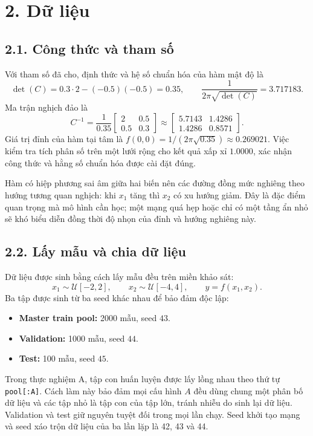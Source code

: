 \documentclass[12pt,a4paper]{article}
\begin{document}
\section{2. Dữ liệu}

\subsection{2.1. Công thức và tham số}

Với tham số đã cho, định thức và hệ số chuẩn hóa của hàm mật độ là
$$\det(C) = 0.3\cdot 2 - (-0.5)(-0.5) = 0.35, \qquad \frac{1}{2\pi\sqrt{\det(C)}} = 3.717183.$$
Ma trận nghịch đảo là
$$C^{-1} = \frac{1}{0.35}\begin{bmatrix}2 & 0.5\\ 0.5 & 0.3\end{bmatrix} \approx \begin{bmatrix}5.7143 & 1.4286\\ 1.4286 & 0.8571\end{bmatrix}.$$
Giá trị đỉnh của hàm tại tâm là $f(0,0) = 1/(2\pi\sqrt{0.35}) \approx 0.269021$. Việc kiểm tra tích phân số trên một lưới rộng cho kết quả xấp xỉ $1.0000$, xác nhận công thức và hằng số chuẩn hóa được cài đặt đúng.

Hàm có hiệp phương sai âm giữa hai biến nên các đường đồng mức nghiêng theo hướng tương quan nghịch: khi $x_1$ tăng thì $x_2$ có xu hướng giảm. Đây là đặc điểm quan trọng mà mô hình cần học; một mạng quá hẹp hoặc chỉ có một tầng ẩn nhỏ sẽ khó biểu diễn đồng thời độ nhọn của đỉnh và hướng nghiêng này.

\subsection{2.2. Lấy mẫu và chia dữ liệu}

Dữ liệu được sinh bằng cách lấy mẫu đều trên miền khảo sát:
$$x_1 \sim \mathcal{U}[-2, 2], \qquad x_2 \sim \mathcal{U}[-4, 4], \qquad y = f(x_1, x_2).$$
Ba tập được sinh từ ba seed khác nhau để bảo đảm độc lập:

\begin{itemize}
\item \textbf{Master train pool:} 2000 mẫu, seed $43$.
\item \textbf{Validation:} 1000 mẫu, seed $44$.
\item \textbf{Test:} 100 mẫu, seed $45$.
\end{itemize}

Trong thực nghiệm A, tập con huấn luyện được lấy lồng nhau theo thứ tự \texttt{pool[:A]}. Cách làm này bảo đảm mọi cấu hình $A$ đều dùng chung một phân bố dữ liệu và các tập nhỏ là tập con của tập lớn, tránh nhiễu do sinh lại dữ liệu. Validation và test giữ nguyên tuyệt đối trong mọi lần chạy. Seed khởi tạo mạng và seed xáo trộn dữ liệu của ba lần lặp là 42, 43 và 44.
\end{document}

